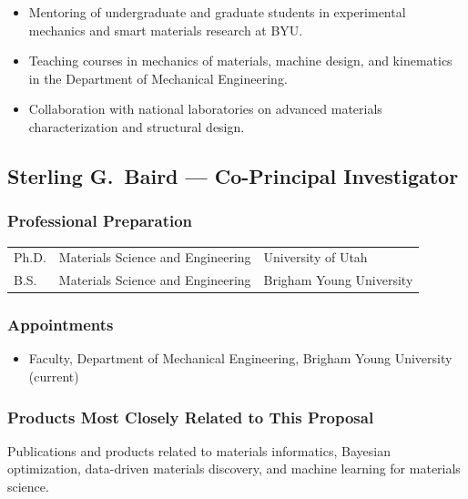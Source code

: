 \begin{itemize}[nosep]
    \item Mentoring of undergraduate and graduate students in experimental
        mechanics and smart materials research at BYU.
    \item Teaching courses in mechanics of materials, machine design, and
        kinematics in the Department of Mechanical Engineering.
    \item Collaboration with national laboratories on advanced materials
        characterization and structural design.
\end{itemize}

\vspace{2em}
\newpage
\subsection*{Sterling G.\ Baird --- Co-Principal Investigator}

\subsubsection*{Professional Preparation}

\begin{tabular}{@{}lll@{}}
Ph.D. & Materials Science and Engineering & University of Utah \\
B.S.  & Materials Science and Engineering & Brigham Young University \\
\end{tabular}

\subsubsection*{Appointments}

\begin{itemize}[nosep]
    \item Faculty, Department of Mechanical Engineering, Brigham Young University (current)
\end{itemize}

\subsubsection*{Products Most Closely Related to This Proposal}

Publications and products related to materials informatics, Bayesian
optimization, data-driven materials discovery, and machine learning for
materials science.

